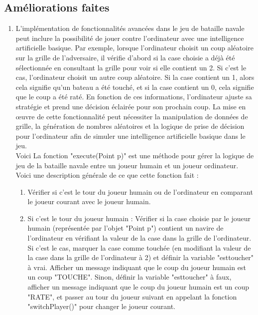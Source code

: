 \documentclass{rapport}
\begin{document}
{    \subsection{Améliorations faites}
            \begin{enumerate}
                \item L'implémentation de fonctionnalités avancées dans le jeu de bataille navale peut inclure la possibilité de jouer contre l'ordinateur avec une intelligence artificielle basique. Par exemple, lorsque l'ordinateur choisit un coup aléatoire sur la grille de l'adversaire, il vérifie d'abord si la case choisie a déjà été sélectionnée en consultant la grille pour voir si elle contient un 2. Si c'est le cas, l'ordinateur choisit un autre coup aléatoire. Si la case contient un 1, alors cela signifie qu'un bateau a été touché, et si la case contient un 0, cela signifie que le coup a été raté. En fonction de ces informations, l'ordinateur ajuste sa stratégie et prend une décision éclairée pour son prochain coup. La mise en œuvre de cette fonctionnalité peut nécessiter la manipulation de données de grille, la génération de nombres aléatoires et la logique de prise de décision pour l'ordinateur afin de simuler une intelligence artificielle basique dans le jeu.\\
                Voici La fonction "execute(Point p)"  est une méthode pour gérer la logique de jeu de la bataille navale entre un joueur humain et un joueur ordinateur. \\Voici une description générale de ce que cette fonction fait :
\begin{enumerate}
    \item Vérifier si c'est le tour du joueur humain ou de l'ordinateur en comparant le joueur courant avec le joueur humain.
    \item Si c'est le tour du joueur humain :
        Vérifier si la case choisie par le joueur humain (représentée par l'objet "Point p") contient un navire de l'ordinateur en vérifiant la valeur de la case dans la grille de l'ordinateur. Si c'est le cas, marquer la case comme touchée (en modifiant la valeur de la case dans la grille de l'ordinateur à 2) et définir la variable "esttoucher" à vrai.
        Afficher un message indiquant que le coup du joueur humain est un coup "TOUCHE".
        Sinon, définir la variable "esttoucher" à faux, afficher un message indiquant que le coup du joueur humain est un coup "RATE", et passer au tour du joueur suivant en appelant la fonction "switchPlayer()" pour changer le joueur courant.

\end{enumerate}
\end{enumerate}}
\end{document}
